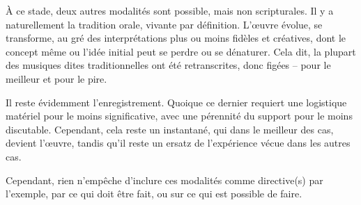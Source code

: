 \documentclass{article}
\begin{document}

\bigskip

À ce stade, deux autres modalités sont possible, mais non scripturales. Il y a naturellement la tradition orale, vivante par définition.  L'œuvre évolue, se transforme, au gré des interprétations plus ou moins fidèles et créatives, dont le concept même ou l'idée initial peut se perdre ou se dénaturer. Cela dit, la plupart des musiques dites traditionnelles ont été retranscrites, donc figées -- pour le meilleur et pour le pire. 

Il reste évidemment l'enregistrement. Quoique ce dernier requiert une logistique matériel pour le moins significative, avec une pérennité du support pour le moins discutable. Cependant, cela reste un instantané, qui dans le meilleur des cas, devient l'œuvre, tandis qu'il reste un ersatz de l'expérience vécue dans les autres cas.%

Cependant, rien n'empêche d'inclure ces modalités comme directive(s) par l'exemple, par ce qui doit être fait, ou sur ce qui est possible de faire.


%
%
%
%
%
%
%
%
%
\bigskip
\end{document}
